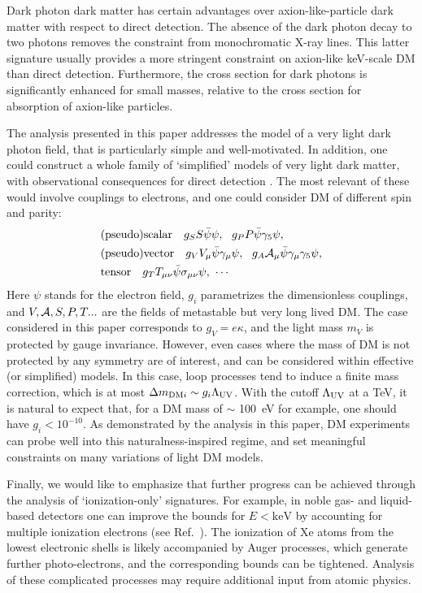 \documentclass[prd,reprint,nofootinbib,notitlepage,aps,tightenlines,preprintnumbers,amsmath,amssymb,showpacs,superscriptaddress]{revtex4-1}
\newcommand{\keV}{\ensuremath{\mathrm{keV}}}
\begin{document}
Dark photon dark matter has certain advantages over
axion-like-particle dark matter with respect to direct detection. The
absence of the dark photon decay to two photons removes the constraint
from monochromatic X-ray lines. This latter signature usually provides a more
stringent constraint on axion-like keV-scale DM than direct detection. Furthermore, 
the cross section for dark photons is significantly
enhanced for small masses, relative to the cross section for
absorption of axion-like particles.

The analysis presented in this paper addresses the model of a very
light dark photon field, that is particularly simple and
well-motivated. In addition, one could construct a whole family of
`simplified' models of very light dark matter, with observational
consequences for direct detection \cite{Pospelov:2008jk}. The most
relevant of these would involve couplings to electrons, and one could
consider DM of different spin and parity:
\begin{align}
\label{variety}
&{\rm (pseudo)scalar}~~~g_S S \bar \psi \psi,~~ g_P P \bar \psi \gamma_5 \psi, \nonumber \\
&{\rm (pseudo)vector}~~~g_V V_\mu \bar \psi \gamma_\mu \psi, ~~ g_A {\cal A}_\mu \bar \psi \gamma_\mu \gamma_5 \psi, \\
&{\rm tensor}~~~g_T T_{\mu\nu} \bar \psi \sigma_{\mu\nu} \psi, ~\cdots \nonumber
\end{align}
Here $\psi$ stands for the electron field, $g_i$ parametrizes the
dimensionless couplings, and $V,{\cal A},S,P,T...$ are the fields of
metastable but very long lived DM. The case considered in this paper
corresponds to $g_V = e\kappa$, and the light mass $m_V$ is protected by
gauge invariance.  However, even cases where the mass of DM is not protected by any symmetry are of
interest, and can be considered within effective (or simplified)
models. In this case, loop processes tend to induce a finite mass
correction, which is at most
$\Delta m_{{\rm DM}i} \sim g_i \Lambda_{\rm UV}$. With the cutoff
$\Lambda_{\rm UV}$ at a TeV, it is natural to expect that, for a
DM mass of $\sim$ 100~eV for example, one should have $g_i< 10^{-10}$. As
demonstrated by the analysis in this paper, DM experiments can
probe well into this naturalness-inspired regime, and set meaningful constraints
on many variations of light DM models.

Finally, we would like to emphasize that further progress can be
achieved through the analysis of `ionization-only' signatures.  For
example, in noble gas- and liquid-based detectors one can improve the
bounds for $E<\keV$ by accounting for multiple ionization electrons
(see Ref.~\cite{Essig:2012yx}). The ionization of Xe atoms from the lowest
electronic shells is likely accompanied by Auger processes,
which generate further photo-electrons, and the corresponding bounds
can be tightened.  Analysis of these complicated processes may require
additional input from atomic physics.
\end{document}
